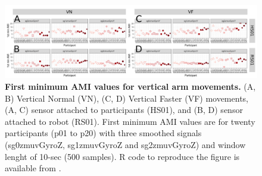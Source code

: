 \begin{figure}[!h]
\centering
\includegraphics[width=1.0\textwidth]{ami_aVw10}
	\caption{
	{\bf First minimum AMI values for vertical arm movements.}
		(A, B) Vertical Normal (VN), (C, D) Vertical Faster (VF) movements,
		(A, C) sensor attached to participants (HS01), and
		(B, D) sensor attached to robot (RS01).
		First minimum AMI values are for twenty participants (p01 to p20) 
		with three smoothed signals (sg0zmuvGyroZ, sg1zmuvGyroZ and sg2zmuvGyroZ) 
		and  window lenght of 10-sec (500 samples).
		R code to reproduce the figure is available from \cite{hwum2018}.
        }
    \label{fig:amiV}
\end{figure}









